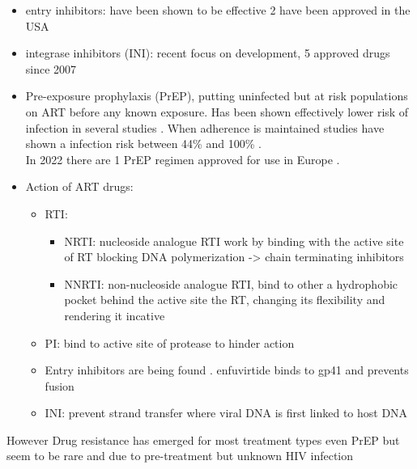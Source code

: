 \documentclass[
  11pt,
  twoside]{scrbook}
\begin{document}
\begin{itemize}
\item
  entry inhibitors: have been shown to be effective 2 have been approved in the USA \autocite{tiltonEntryInhibitorsTreatment2010}
\item
  integrase inhibitors (INI): recent focus on development, 5 approved drugs since 2007 \autocite{scarsiHIV1IntegraseInhibitors2020}
\item
  Pre-exposure prophylaxis (PrEP), putting uninfected but at risk populations on ART before any known exposure. Has been shown effectively lower risk of infection in several studies \autocite{grantPreexposureChemoprophylaxisHIV2010,baetenAntiretroviralProphylaxisHIV2012,buchbinderPreexposureProphylaxisPromise2011}. When adherence is maintained studies have shown a infection risk between 44\% and 100\% \autocite{riddellHIVPreexposureProphylaxis2018}.\\
  In 2022 there are 1 PrEP regimen approved for use in Europe \autocite{emaTruvada2018}.
\item
  Action of ART drugs:

  \begin{itemize}
  \item
    RTI:

    \begin{itemize}
    \item
      NRTI: nucleoside analogue RTI work by binding with the active site of RT blocking DNA polymerization -\textgreater{} chain terminating inhibitors
    \item
      NNRTI: non-nucleoside analogue RTI, bind to other a hydrophobic pocket behind the active site the RT, changing its flexibility and rendering it incative \autocite{esnoufUniqueFeaturesStructure1997}
    \end{itemize}
  \item
    PI: bind to active site of protease to hinder action \autocite{robertsRationalDesignPeptideBased1990}
  \item
    Entry inhibitors are being found \autocite{esteHIVEntryInhibitors2007,kilbyNovelTherapiesBased2003}. enfuvirtide binds to gp41 and prevents fusion \autocite{fletcherEnfuvirtideNewDrug2003}
  \item
    INI: prevent strand transfer where viral DNA is first linked to host DNA \autocite{pommierIntegraseInhibitorsTreat2005}
  \end{itemize}
\end{itemize}

However Drug resistance has emerged for most treatment types even PrEP \autocite{knoxMultidrugResistantHIV1Infection2017,hurtPreexposureProphylaxisAntiretroviral2011} but seem to be rare and due to pre-treatment but unknown HIV infection \autocite{gibasDrugResistanceHIV2019}
\end{document}

